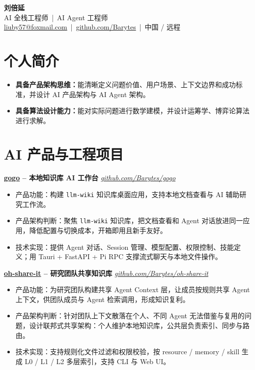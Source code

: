 \documentclass[10pt,letterpaper,fontset=fandol]{ctexart}
\newcommand{\resumeItem}[1]{\item #1}
\newcommand{\projectHeading}[2]{
  \textbf{#1} \hfill \textit{#2}
}
\begin{document}
\small

\begin{center}
  {\LARGE \textbf{刘倍延}} \\
  \vspace{2pt}
  AI 全栈工程师 \,|\, AI Agent 工程师 \\
  \vspace{2pt}
  \href{mailto:liuby57@foxmail.com}{liuby57@foxmail.com} \,|\,
  \href{https://github.com/Barytes}{github.com/Barytes} \,|\, 中国 / 远程 
\end{center}

\section{个人简介}
\begin{itemize}
  \resumeItem{\textbf{具备产品架构思维：}能清晰定义问题价值、用户场景、上下文边界和成功标准，并设计 AI 产品架构与 AI Agent 架构。}
  \resumeItem{\textbf{具备算法设计能力：}能对实际问题进行数学建模，并设计运筹学、博弈论算法进行求解。}
\end{itemize}

\section{AI 产品与工程项目}

\projectHeading{\href{https://github.com/Barytes/gogo}{gogo} -- 本地知识库 AI 工作台}{\href{https://github.com/Barytes/gogo}{github.com/Barytes/gogo}}
\begin{itemize}
  \resumeItem{产品功能：构建 \texttt{llm-wiki} 知识库桌面应用，支持本地文档查看与 AI 辅助研究工作流。}
  \resumeItem{产品架构判断：聚焦 \texttt{llm-wiki} 知识库，把文档查看和 Agent 对话放进同一应用，降低配置与切换成本，开箱即用且新手友好。}
  \resumeItem{技术实现：提供 Agent 对话、Session 管理、模型配置、权限控制、技能定义；用 Tauri + FastAPI + Pi RPC 支撑流式聊天与本地文件操作。}
\end{itemize}

\projectHeading{\href{https://github.com/Barytes/oh-share-it}{oh-share-it} -- 研究团队共享知识库}{\href{https://github.com/Barytes/oh-share-it}{github.com/Barytes/oh-share-it}}
\begin{itemize}
  \resumeItem{产品功能：为研究团队构建共享 Agent Context 层，让成员按规则共享 Agent 上下文，供团队成员与 Agent 检索调用，形成知识复利。}
  \resumeItem{产品架构判断：针对团队上下文散落在个人、不同 Agent 无法借鉴与复用的问题，设计联邦式共享架构：个人维护本地知识库，公共层负责索引、同步与路由。}
  \resumeItem{技术实现：支持规则化文件过滤和权限校验，按 resource / memory / skill 生成 L0 / L1 / L2 多层索引，支持 CLI 与 Web UI。}
\end{itemize}
\end{document}
